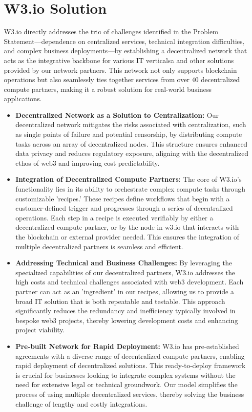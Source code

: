 \documentclass[11pt]{article}
\begin{document}
\section{W3.io Solution}
W3.io directly addresses the trio of challenges identified in the Problem Statement—dependence on centralized services, technical integration difficulties, and complex business deployments—by establishing a decentralized network that acts as the integrative backbone for various IT verticalsa and other solutions provided by our network partners. This network not only supports blockchain operations but also seamlessly ties together services from over 40 decentralized compute partners, making it a robust solution for real-world business applications.
\begin{itemize}
    \item \textbf{Decentralized Network as a Solution to Centralization:} Our decentralized network mitigates the risks associated with centralization, such as single points of failure and potential censorship, by distributing compute tasks across an array of decentralized nodes. This structure ensures enhanced data privacy and reduces regulatory exposure, aligning with the decentralized ethos of web3 and improving cost predictability.
    \item \textbf{Integration of Decentralized Compute Partners:} The core of W3.io's functionality lies in its ability to orchestrate complex compute tasks through customizable 'recipes.' These recipes define workflows that begin with a customer-defined trigger and progresses through a series of decentralized operations. Each step in a recipe is executed verifiably by either a decentralized compute partner, or by the node in w3.io that interacts with the blockchain or external provider needed. This ensures the integration of multiple decentralized partners is seamless and efficient.
    \item \textbf{Addressing Technical and Business Challenges:} By leveraging the specialized capabilities of our decentralized partners, W3.io addresses the high costs and technical challenges associated with web3 development. Each partner can act as an 'ingredient' in our recipes, allowing us to provide a broad IT solution that is both repeatable and testable. This approach significantly reduces the redundancy and inefficiency typically involved in bespoke web3 projects, thereby lowering development costs and enhancing project viability.
    \item \textbf{Pre-built Network for Rapid Deployment:} W3.io has pre-established agreements with a diverse range of decentralized compute partners, enabling rapid deployment of decentralized solutions. This ready-to-deploy framework is crucial for businesses looking to integrate complex systems without the need for extensive legal or technical groundwork. Our model simplifies the process of using multiple decentralized services, thereby solving the business challenge of lengthy and costly integrations.

\end{itemize}
\end{document}
